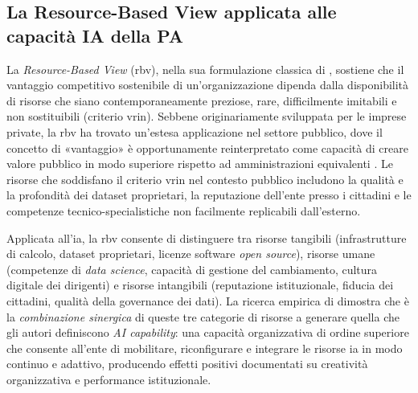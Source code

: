 \subsection{La Resource-Based View applicata alle capacità IA della PA}

La \textit{Resource-Based View} (\gls{rbv}), nella sua formulazione classica di \textcite{Barney1991}, sostiene che il vantaggio competitivo sostenibile di un'organizzazione dipenda dalla disponibilità di risorse che siano contemporaneamente preziose, rare, difficilmente imitabili e non sostituibili (criterio \gls{vrin}). Sebbene originariamente sviluppata per le imprese private, la \gls{rbv} ha trovato un'estesa applicazione nel settore pubblico, dove il concetto di «vantaggio» è opportunamente reinterpretato come capacità di creare valore pubblico in modo superiore rispetto ad amministrazioni equivalenti \parencite{Mikalef2021}. Le risorse che soddisfano il criterio \gls{vrin} nel contesto pubblico includono la qualità e la profondità dei dataset proprietari, la reputazione dell'ente presso i cittadini e le competenze tecnico-specialistiche non facilmente replicabili dall'esterno.

Applicata all'\gls{ia}, la \gls{rbv} consente di distinguere tra risorse tangibili (infrastrutture di calcolo, dataset proprietari, licenze software \textit{open source}), risorse umane (competenze di \textit{data science}, capacità di gestione del cambiamento, cultura digitale dei dirigenti) e risorse intangibili (reputazione istituzionale, fiducia dei cittadini, qualità della governance dei dati). La ricerca empirica di \textcite{Mikalef2021} dimostra che è la \textit{combinazione sinergica} di queste tre categorie di risorse a generare quella che gli autori definiscono \textit{AI capability}: una capacità organizzativa di ordine superiore che consente all'ente di mobilitare, riconfigurare e integrare le risorse \gls{ia} in modo continuo e adattivo, producendo effetti positivi documentati su creatività organizzativa e performance istituzionale.

